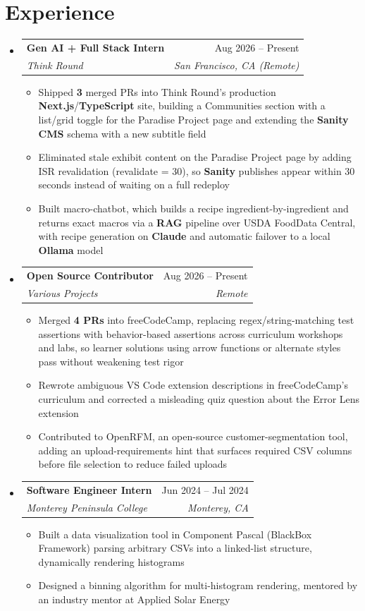 \documentclass[letterpaper,10.5pt]{article}
\makeatletter
\newcommand{\resumeItem}[1]{
  \item\small{{#1 \vspace{-3pt}}}
}
\newcommand{\resumeSubheading}[4]{
  \vspace{-2pt}\item
    \begin{tabular*}{0.97\textwidth}[t]{l@{\extracolsep{\fill}}r}
      \textbf{\normalsize #1} & \normalsize #2 \\[-1pt]
      \textit{\small#3} & \textit{\small #4} \\
    \end{tabular*}\vspace{-7pt}
}
\newcommand{\resumeSubHeadingListStart}{\begin{itemize}[leftmargin=0.15in, label={}]}
\newcommand{\resumeSubHeadingListEnd}{\end{itemize}}
\newcommand{\resumeItemListStart}{\begin{itemize}[leftmargin=0.15in, label=\textbullet]}
\newcommand{\resumeItemListEnd}{\end{itemize}\vspace{-5pt}}
\makeatother
\begin{document}
\section{Experience}
  \resumeSubHeadingListStart
    \resumeSubheading
      {Gen AI + Full Stack Intern}{Aug 2026 -- Present}
      {Think Round}{San Francisco, CA (Remote)}
      \resumeItemListStart
        \resumeItem{Shipped \textbf{3} merged PRs into Think Round's production \textbf{Next.js}/\textbf{TypeScript} site, building a Communities section with a list/grid toggle for the Paradise Project page and extending the \textbf{Sanity CMS} schema with a new subtitle field}
        \resumeItem{Eliminated stale exhibit content on the Paradise Project page by adding ISR revalidation (revalidate = 30), so \textbf{Sanity} publishes appear within 30 seconds instead of waiting on a full redeploy}
        \resumeItem{Built macro-chatbot, which builds a recipe ingredient-by-ingredient and returns exact macros via a \textbf{RAG} pipeline over USDA FoodData Central, with recipe generation on \textbf{Claude} and automatic failover to a local \textbf{Ollama} model}
      \resumeItemListEnd
    \resumeSubheading
      {Open Source Contributor}{Aug 2026 -- Present}
      {Various Projects}{Remote}
      \resumeItemListStart
        \resumeItem{Merged \textbf{4 PRs} into freeCodeCamp, replacing regex/string-matching test assertions with behavior-based assertions across curriculum workshops and labs, so learner solutions using arrow functions or alternate styles pass without weakening test rigor}
        \resumeItem{Rewrote ambiguous VS Code extension descriptions in freeCodeCamp's curriculum and corrected a misleading quiz question about the Error Lens extension}
        \resumeItem{Contributed to OpenRFM, an open-source customer-segmentation tool, adding an upload-requirements hint that surfaces required CSV columns before file selection to reduce failed uploads}
      \resumeItemListEnd
    \resumeSubheading
      {Software Engineer Intern}{Jun 2024 -- Jul 2024}
      {Monterey Peninsula College}{Monterey, CA}
      \resumeItemListStart
        \resumeItem{Built a data visualization tool in Component Pascal (BlackBox Framework) parsing arbitrary CSVs into a linked-list structure, dynamically rendering histograms}
        \resumeItem{Designed a binning algorithm for multi-histogram rendering, mentored by an industry mentor at Applied Solar Energy}
      \resumeItemListEnd
  \resumeSubHeadingListEnd
\end{document}
